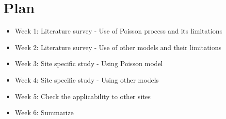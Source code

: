 \documentclass[a4paper,english,12pt]{article}
\begin{document}
\section{Plan}
\begin{itemize}
\item Week 1: Literature survey - Use of Poisson process and its limitations
\item Week 2: Literature survey - Use of other models and their limitations
\item Week 3: Site specific study - Using Poisson model
\item Week 4: Site specific study - Using other models
\item Week 5: Check the applicability to other sites
\item Week 6: Summarize
\end{itemize}
\end{document}
